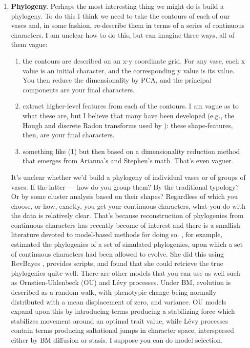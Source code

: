 \documentclass[onecolumn,10pt]{article}
\begin{document}
\begin{enumerate}
\item \textbf{Phylogeny.} Perhaps the most interesting thing we might do is build a phylogeny.  To do this I think we need to take the contours of each of our vases and, in some fashion, re-describe them in terms of a series of continuous characters.  I am unclear how to do this, but can imagine three ways, all of them vague: 
\begin{enumerate}
    \item the contours are described on an x-y coordinate grid. For any vase, each x value is an initial character, and the corresponding y value is its value. You then reduce the dimensionality by PCA, and the principal components are your final characters. 
    \item extract higher-level features from each of the contours. I am vague as to what these are, but I believe that many have been developed (e.g., the Hough and discrete Radon transforms used by \cite{Ryan2009}): these shape-features, then, are your final characters.
    \item something like (1) but then based on a dimensionality reduction method that emerges from Arianna's and Stephen's math. That's even vaguer.
\end{enumerate}

It's unclear whether we'd build a phylogeny of individual vases or of groups of vases. If the latter --- how do you group them?  By the traditional typology? Or by some cluster analysis based on their shapes?  Regardless of which you choose, or how, exactly, you get your continuous characters, what you do with the data is relatively clear.  That's because reconstruction of phylogenies from continuous characters has recently become of interest and there is a smallish literature devoted to model-based methods for doing so. \cite{Parins2017}, for example, estimated the phylogenies of a set of simulated phylogenies, upon which a set of continuous characters had been allowed to evolve.  She did this using RevBayes \parencite{Huelsenbeck2016}, provides scripts, and found that she could retrieve the true phylogenies quite well. There are other models that you can use as well such as Ornstien-Uhlenbeck (OU) and L\'{e}vy processes. Under BM, evolution is described as a random walk, with phenotypic change being normally distributed with a mean displacement of zero, and variance. OU models expand upon this by introducing terms producing a stabilizing force which stabilizes movement around an optimal trait value, while L\'{e}vy processes contain terms producing saltational jumps in character space, interspersed either by BM diffusion or stasis.  I suppose you can do model selection.


\end{enumerate}
\end{document}
